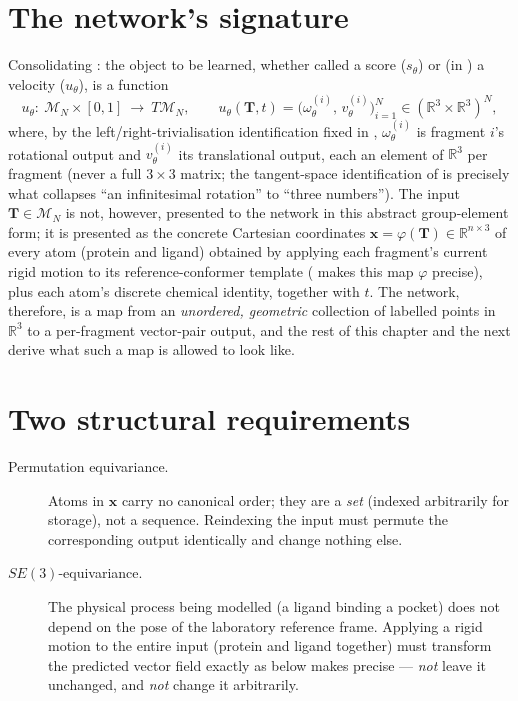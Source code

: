 \documentclass[11pt,a4paper]{report}
\theoremstyle{definition}
\theoremstyle{remark}
\newcommand{\RR}{\mathbb R}
\begin{document}
\section{The network's signature}
\label{sec:network-signature-scratch}

Consolidating : the object to be
learned, whether called a score ($s_\theta$) or (in
) a velocity ($u_\theta$), is a function
\begin{equation}
\label{eq:network-signature-scratch}
u_\theta:\ \mathcal M_N\times[0,1]\ \longrightarrow\ T\mathcal M_N,
\qquad
u_\theta(\mathbf T,t) = \bigl(\omega^{(i)}_\theta,\,v^{(i)}_\theta\bigr)_{i=1}^N
\in(\RR^3\times\RR^3)^N ,
\end{equation}
where, by the left/right-trivialisation identification fixed in
, $\omega^{(i)}_\theta$ is fragment $i$'s
rotational output and $v^{(i)}_\theta$ its translational output, each an
element of $\RR^3$ per fragment (never a full $3\times3$ matrix; the
tangent-space identification of  is precisely what
collapses ``an infinitesimal rotation'' to ``three numbers''). The input
$\mathbf T\in\mathcal M_N$ is not, however, presented to the network in
this abstract group-element form; it is presented as the concrete Cartesian
coordinates $\mathbf x=\varphi(\mathbf T)\in\RR^{n\times3}$ of every atom
(protein and ligand) obtained by applying each fragment's current rigid
motion to its reference-conformer template
( makes this map $\varphi$ precise), plus
each atom's discrete chemical identity, together with $t$. The network,
therefore, is a map from an \emph{unordered, geometric} collection of
labelled points in $\RR^3$ to a per-fragment vector-pair output, and the
rest of this chapter and the next derive what such a map is allowed to look
like.

\section{Two structural requirements}
\label{sec:two-requirements}

\begin{description}
\item[Permutation equivariance.] Atoms in $\mathbf x$ carry no canonical
order; they are a \emph{set} (indexed arbitrarily for storage), not a
sequence. Reindexing the input must permute the corresponding output
identically and change nothing else.
\item[$SE(3)$-equivariance.] The physical process being modelled (a ligand
binding a pocket) does not depend on the pose of the laboratory reference
frame. Applying a rigid motion to the entire input (protein and ligand
together) must transform the predicted vector field exactly as
 below makes precise --- \emph{not} leave it
unchanged, and \emph{not} change it arbitrarily.
\end{description}
\end{document}
